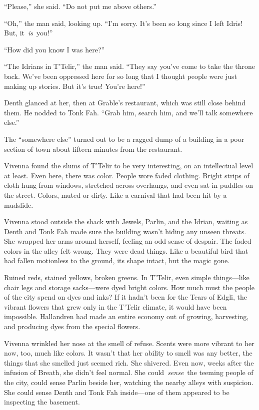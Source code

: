 “Please,” she said. “Do not put me above others.”

“Oh,” the man said, looking up. “I’m sorry. It’s been so long since I left Idris! But, it~\textit{is}~you!”

“How did you know I was here?”

“The Idrians in T’Telir,” the man said. “They say you’ve come to take the throne back. We’ve been oppressed here for so long that I thought people were just making up stories. But it’s true! You’re here!”

Denth glanced at her, then at Grable’s restaurant, which was still close behind them. He nodded to Tonk Fah. “Grab him, search him, and we’ll talk somewhere else.”

\orn

The “somewhere else” turned out to be a ragged dump of a building in a poor section of town about fifteen minutes from the restaurant.

Vivenna found the slums of T’Telir to be very interesting, on an intellectual level at least. Even here, there was color. People wore faded clothing. Bright strips of cloth hung from windows, stretched across overhangs, and even sat in puddles on the street. Colors, muted or dirty. Like a carnival that had been hit by a mudslide.

Vivenna stood outside the shack with Jewels, Parlin, and the Idrian, waiting as Denth and Tonk Fah made sure the building wasn’t hiding any unseen threats. She wrapped her arms around herself, feeling an odd sense of despair. The faded colors in the alley felt wrong. They were dead things. Like a beautiful bird that had fallen motionless to the ground, its shape intact, but the magic gone.

Ruined reds, stained yellows, broken greens. In T’Telir, even simple things—like chair legs and storage sacks—were dyed bright colors. How much must the people of the city spend on dyes and inks? If it hadn’t been for the Tears of Edgli, the vibrant flowers that grew only in the T’Telir climate, it would have been impossible. Hallandren had made an entire economy out of growing, harvesting, and producing dyes from the special flowers.

Vivenna wrinkled her nose at the smell of refuse. Scents were more vibrant to her now, too, much like colors. It wasn’t that her ability to smell was any better, the things that she smelled just seemed rich. She shivered. Even now, weeks after the infusion of Breath, she didn’t feel normal. She could~\textit{sense}~the teeming people of the city, could sense Parlin beside her, watching the nearby alleys with suspicion. She could sense Denth and Tonk Fah inside—one of them appeared to be inspecting the basement.

